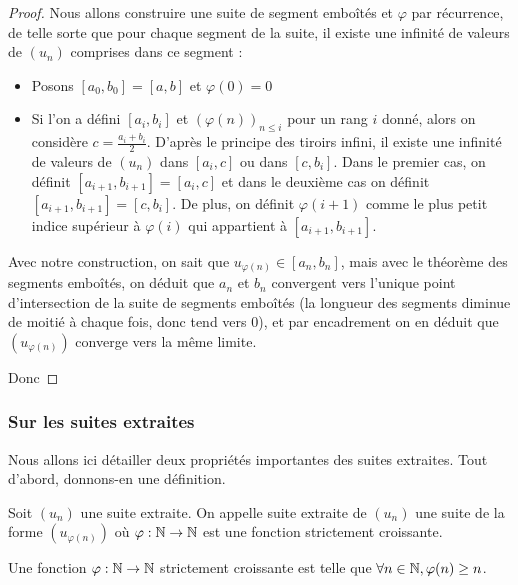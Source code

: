 \begin{proof}
    Nous allons construire une suite de segment emboîtés et $\varphi$ par récurrence, de telle sorte que pour chaque segment de la suite, il existe une infinité de valeurs de $(u_n)$ comprises dans ce segment :
    \begin{itemize}[label=$\bullet$]
        \item Posons $[a_0,b_0]=[a,b]$ et $\varphi(0) = 0$
        \item Si l'on a défini $[a_i,b_i]$ et $(\varphi(n))_{n\leq i}$ pour un rang $i$ donné, alors on considère $c = \displaystyle{\frac{a_i+b_i}{2}}$. D'après le principe des tiroirs infini, il existe une infinité de valeurs de $(u_n)$ dans $[a_i,c]$ ou dans $[c,b_i]$. Dans le premier cas, on définit $[a_{i+1},b_{i+1}]=[a_i,c]$ et dans le deuxième cas on définit $[a_{i+1},b_{i+1}]=[c,b_i]$. De plus, on définit $\varphi(i+1)$ comme le plus petit indice supérieur à $\varphi(i)$ qui appartient à $[a_{i+1},b_{i+1}]$.
    \end{itemize}
    Avec notre construction, on sait que $u_{\varphi(n)}\in [a_n,b_n]$, mais avec le théorème des segments emboîtés, on déduit que $a_n$ et $b_n$ convergent vers l'unique point d'intersection de la suite de segments emboîtés (la longueur des segments diminue de moitié à chaque fois, donc tend vers $0$), et par encadrement on en déduit que $(u_{\varphi(n)})$ converge vers la même limite. 
    
    Donc 
\end{proof}

\subsubsection{Sur les suites extraites}

Nous allons ici détailler deux propriétés importantes des suites extraites. Tout d'abord, donnons-en une définition.

\begin{defi}
    Soit $(u_n)$ une suite extraite. On appelle suite extraite de $(u_n)$ une suite de la forme $(u_{\varphi(n)})$ où $\varphi : \mathbb{N}\to\mathbb{N}$ est une fonction strictement croissante.
\end{defi}

\begin{prop}
    Une fonction $\varphi:\mathbb{N}\to\mathbb{N}$ strictement croissante est telle que $\forall n\in\mathbb{N}, \varphi(n)\geq n$.
\end{prop}

